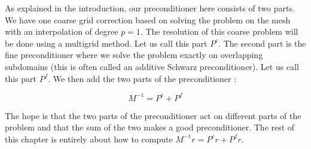 As explained in the introduction, our preconditioner here consists of two parts. We have one coarse grid correction based on solving the problem on the mesh with an interpolation of degree $p=1$. The resolution of this coarse problem will be done using a multigrid method. Let us call this part $P^c$. The second part is the fine preconditioner where we solve the problem exactly on overlapping subdomains (this is often called an additive Schwarz preconditioner). Let us call this part $P^f$. We then add the two parts of the preconditioner : 

$$ M^{-1} = P^c + P^f$$

The hope is that the two parts of the preconditioner act on different parts of the problem and that the sum of the two makes a good preconditioner. The rest of this chapter is entirely about how to compute $M^{-1}r = P^cr+P^fr$.

 

